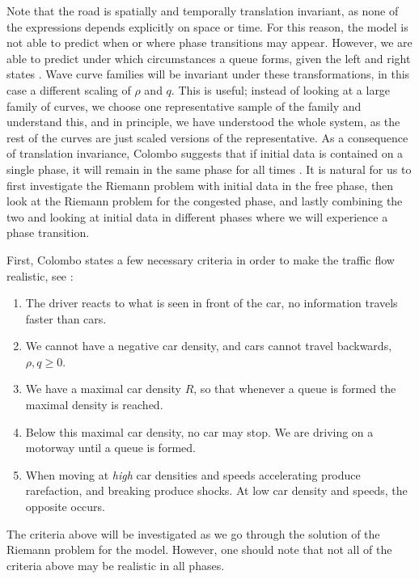 \documentclass[10pt]{article}
\numberwithin{equation}{section}
\begin{document}
Note that the road is spatially and temporally translation invariant,  as none of the expressions depends explicitly on space or time. For this reason, the model is not able to predict when or where phase transitions may appear. However, we are able to predict under which circumstances a queue forms, given the left and right states \cite{Colombo2003}. Wave curve families will be invariant under these transformations, in this case a different scaling of $\rho$ and $q$. This is useful; instead of looking at a  large family of curves, we choose one representative sample of the family and understand this, and in principle, we have understood the whole system, as the rest of the curves are just scaled versions of the representative. As a consequence of translation invariance, Colombo suggests that if initial data is contained on a single phase, it will remain in the same phase for all times \cite{Colombo2003}. It is natural for us to first investigate the Riemann problem with initial data in the free phase, then look at the Riemann problem for the congested phase, and lastly combining the two and looking at initial data in different phases where we will experience a phase transition.

First, Colombo states a few necessary criteria in order to make the traffic flow realistic, see \cite{Colombo2002}:
\begin{enumerate}
    \item The driver reacts to what is seen in front of the car, no information travels faster than cars.
    \item We cannot have a negative car density, and cars cannot travel backwards, $\rho, q \geq 0$.
    \item We have a maximal car density $R$, so that whenever a queue is formed the maximal density is reached. 
    \item Below this maximal car density, no car may stop. We are driving on a motorway until a  queue is formed. 
    \item When moving at \textit{high} car densities and speeds accelerating produce rarefaction, and breaking produce shocks. At low car density and speeds, the opposite occurs. 
\end{enumerate} The criteria above will be investigated as we go through the solution of the Riemann problem for the model. However, one should note that not all of the criteria above may be realistic in all phases. 
\end{document}
